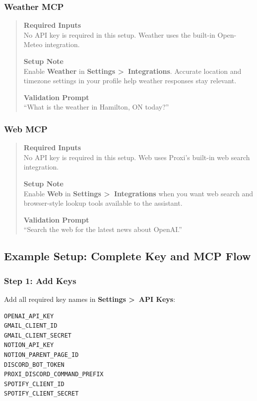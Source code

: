\documentclass{article}
\begin{document}
\subsubsection{Weather MCP}
\begin{quote}
\noindent\textbf{Required Inputs}\\
No API key is required in this setup. Weather uses the built-in Open-Meteo integration.

\medskip
\noindent\textbf{Setup Note}\\
Enable \textbf{Weather} in \textbf{Settings \textgreater\ Integrations}. Accurate location and timezone settings in your profile help weather responses stay relevant.

\medskip
\noindent\textbf{Validation Prompt}\\
``What is the weather in Hamilton, ON today?''
\end{quote}

\subsubsection{Web MCP}
\begin{quote}
\noindent\textbf{Required Inputs}\\
No API key is required in this setup. Web uses Proxi's built-in web search integration.

\medskip
\noindent\textbf{Setup Note}\\
Enable \textbf{Web} in \textbf{Settings \textgreater\ Integrations} when you want web search and browser-style lookup tools available to the assistant.

\medskip
\noindent\textbf{Validation Prompt}\\
``Search the web for the latest news about OpenAI.''
\end{quote}

\subsection{Example Setup: Complete Key and MCP Flow}

\subsubsection{Step 1: Add Keys}
Add all required key names in \textbf{Settings \textgreater\ API Keys}:
\begin{verbatim}
OPENAI_API_KEY
GMAIL_CLIENT_ID
GMAIL_CLIENT_SECRET
NOTION_API_KEY
NOTION_PARENT_PAGE_ID
DISCORD_BOT_TOKEN
PROXI_DISCORD_COMMAND_PREFIX
SPOTIFY_CLIENT_ID
SPOTIFY_CLIENT_SECRET
\end{verbatim}
\end{document}
